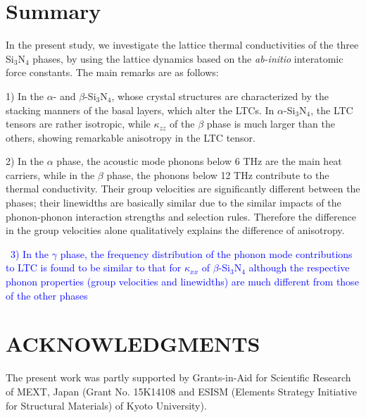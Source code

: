 \documentclass[twocolumn,amsmath,amssymb,a4paper,prb,superscriptaddress,floatfix]{revtex4-1}
\begin{document}

\section{Summary}

In the present study, we investigate the lattice thermal conductivities of the
three Si$_3$N$_4$ phases, by using the lattice dynamics based on the {\it
ab-initio} interatomic force constants. The main remarks are as follows:

1) In the $\alpha$- and $\beta$-Si$_3$N$_4$, whose crystal structures are
characterized by the stacking manners of the basal layers, which alter the
LTCs. In $\alpha$-Si$_3$N$_4$, the LTC tensors are rather isotropic, while
$\kappa$$_{zz}$ of the $\beta$ phase is much larger than the others, showing
remarkable anisotropy in the LTC tensor. 

2) In the $\alpha$ phase, the acoustic mode phonons below 6 THz are the main
heat carriers, while in the $\beta$ phase, the phonons below 12 THz contribute
to the thermal conductivity. Their group velocities are significantly different
between the phases; their linewidths are basically similar due to the similar
impacts of the phonon-phonon interaction strengths and selection rules.
Therefore the difference in the group velocities alone qualitatively explains
the difference of anisotropy.

~\textcolor{blue}{3) In the $\gamma$ phase, the frequency distribution of the
phonon mode contributions to LTC is found to be similar to that for
$\kappa$$_{xx}$ of $\beta$-Si$_3$N$_4$ although the respective phonon properties 
(group velocities and linewidths) are much different from those of the other phases}

\section*{ACKNOWLEDGMENTS}
The present work was partly supported by Grants-in-Aid for Scientific
Research of MEXT, Japan (Grant No. 15K14108 and ESISM (Elements Strategy
Initiative for Structural Materials) of Kyoto University).

\appendix
\end{document}
